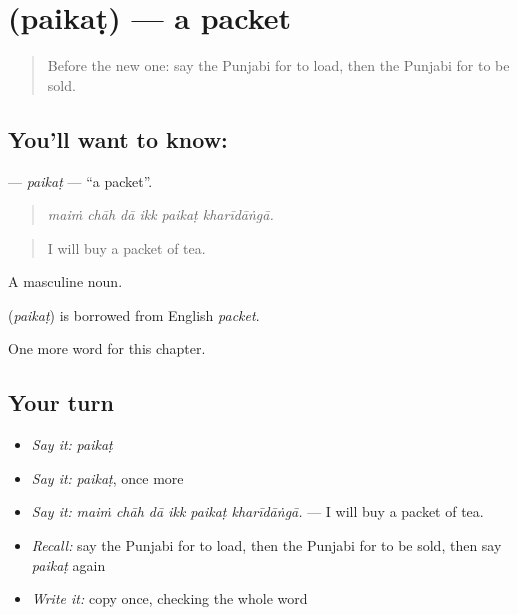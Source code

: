 \section[\texorpdfstring{\pa{ਪੈਕਟ} (paikaṭ)}{ਪੈਕਟ (paikaṭ)}]{ (paikaṭ) — a packet}

\label{lesson:PA-C278-paikat}



\begin{quote}
Before the new one: say the Punjabi for to load, then the Punjabi for to be sold.
\end{quote}

\subsection*{You'll want to know: }
\textbf{} — \emph{paikaṭ} — \textquotedblleft{}a packet\textquotedblright{}.

\begin{quote}
     
\end{quote}

\begin{quote}
\emph{maiṁ chāh dā ikk paikaṭ kharīdāṅgā.}
\end{quote}

\begin{quote}
I will buy a packet of tea.
\end{quote}

A masculine noun.

\begin{cousinweb}
\textbf{} (\emph{paikaṭ}) is borrowed from English \emph{packet}.
\end{cousinweb}

\begin{grammarlens}[title={What you've built}]
One more word for this chapter.
\end{grammarlens}

\subsection*{Your turn}
\begin{itemize}
\raggedright
  \item \emph{Say it:} \emph{paikaṭ}
  \item \emph{Say it:} \emph{paikaṭ}, once more
  \item \emph{Say it:} \emph{maiṁ chāh dā ikk paikaṭ kharīdāṅgā.} — I will buy a packet of tea.
  \item \emph{Recall:} say the Punjabi for to load, then the Punjabi for to be sold, then say \emph{paikaṭ} again
  \item \emph{Write it:} copy \textbf{} once, checking the whole word
\end{itemize}

